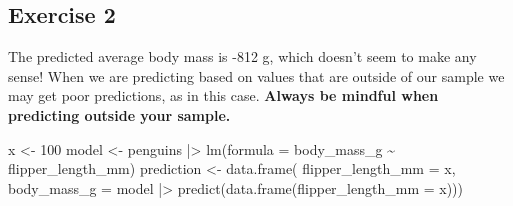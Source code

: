 \documentclass[
  letterpaper,
  DIV=11,
  numbers=noendperiod]{scrreprt}
\newenvironment{Shaded}{\begin{snugshade}}{\end{snugshade}}
\newcommand{\AttributeTok}[1]{\textcolor[rgb]{0.40,0.45,0.13}{#1}}
\newcommand{\DecValTok}[1]{\textcolor[rgb]{0.68,0.00,0.00}{#1}}
\newcommand{\FunctionTok}[1]{\textcolor[rgb]{0.28,0.35,0.67}{#1}}
\newcommand{\NormalTok}[1]{\textcolor[rgb]{0.00,0.23,0.31}{#1}}
\newcommand{\OtherTok}[1]{\textcolor[rgb]{0.00,0.23,0.31}{#1}}
\newcommand{\SpecialCharTok}[1]{\textcolor[rgb]{0.37,0.37,0.37}{#1}}
\begin{document}
\subsection{Exercise 2}\label{exercise-2-18}

The predicted average body mass is -812 g, which doesn't seem to make
any sense! When we are predicting based on values that are outside of
our sample we may get poor predictions, as in this case. \textbf{Always
be mindful when predicting outside your sample.}

\begin{Shaded}
\begin{Highlighting}[]
\NormalTok{x }\OtherTok{\textless{}{-}} \DecValTok{100}
\NormalTok{model }\OtherTok{\textless{}{-}}\NormalTok{ penguins }\SpecialCharTok{|\textgreater{}} 
  \FunctionTok{lm}\NormalTok{(}\AttributeTok{formula =}\NormalTok{ body\_mass\_g }\SpecialCharTok{\textasciitilde{}}\NormalTok{ flipper\_length\_mm)}
\NormalTok{prediction }\OtherTok{\textless{}{-}} \FunctionTok{data.frame}\NormalTok{(}
  \AttributeTok{flipper\_length\_mm =}\NormalTok{ x,}
  \AttributeTok{body\_mass\_g =}\NormalTok{ model }\SpecialCharTok{|\textgreater{}} \FunctionTok{predict}\NormalTok{(}\FunctionTok{data.frame}\NormalTok{(}\AttributeTok{flipper\_length\_mm =}\NormalTok{ x)))}


\end{Highlighting}
\end{Shaded}
\end{document}
